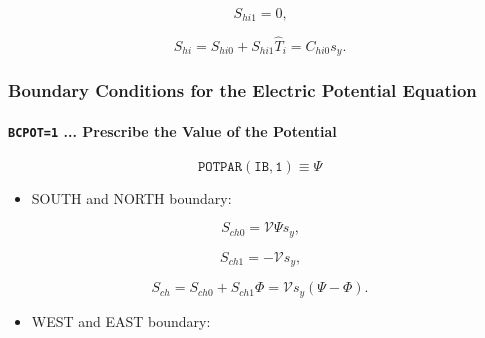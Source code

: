 \documentclass[11pt]{article}
\begin{document}
\begin{equation}
S_{hi1}=0\text{,}   \label{c294}
\end{equation}

\begin{equation}
S_{hi}=S_{hi0}+S_{hi1}\widehat{T}_{i}=C_{hi0}s_{y}\text{.}   \label{c295}
\end{equation}

\bigskip

\bigskip

\subsubsection{Boundary Conditions for the Electric Potential Equation}

\bigskip

\paragraph{\texttt{BCPOT=1} ... Prescribe the Value of the Potential}

\bigskip

\begin{equation*}
\mathtt{POTPAR(IB,1)}\equiv\Psi 
\end{equation*}

\bigskip

\begin{itemize}
\item  SOUTH and NORTH boundary:
\end{itemize}

\bigskip

\begin{equation}
S_{ch0}=\mathcal{V}\Psi s_{y}\text{,}   \label{c296}
\end{equation}

\begin{equation}
S_{ch1}=-\mathcal{V}s_{y}\text{,}   \label{c297}
\end{equation}

\begin{equation}
S_{ch}=S_{ch0}+S_{ch1}\Phi=\mathcal{V}s_{y}\left( \Psi-\Phi\right) \text{.} 
\label{c298}
\end{equation}

\bigskip

\begin{itemize}
\item  WEST and EAST boundary:
\end{itemize}

\bigskip
\end{document}
